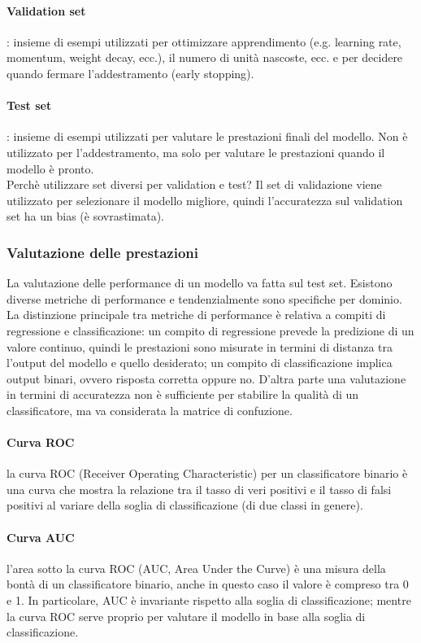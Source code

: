 \paragraph{Validation set}: insieme di esempi utilizzati per ottimizzare
apprendimento (e.g. learning rate, momentum, weight decay, ecc.), il numero di
unità nascoste, ecc. e per decidere quando fermare l'addestramento (early
stopping).

\paragraph{Test set}: insieme di esempi utilizzati per valutare le prestazioni
finali del modello. Non è utilizzato per l'addestramento, ma solo per valutare 
le prestazioni quando il modello è pronto.\\

Perchè utilizzare set diversi per validation e test? Il set di validazione viene
utilizzato per selezionare il modello migliore, quindi l'accuratezza sul
validation set ha un bias (è sovrastimata).

\subsubsection{Valutazione delle prestazioni}

La valutazione delle performance di un modello va fatta sul test set. Esistono
diverse metriche di performance e tendenzialmente sono specifiche per dominio.
La distinzione principale tra metriche di performance è relativa a compiti di
regressione e classificazione: un compito di regressione prevede la predizione
di un valore continuo, quindi le prestazioni sono misurate in termini di
distanza tra l'output del modello e quello desiderato; un compito di
classificazione implica output binari, ovvero risposta corretta oppure no.
D'altra parte una valutazione in termini di accuratezza non è sufficiente per
stabilire la qualità di un classificatore, ma va considerata la matrice di
confuzione.

\paragraph{Curva ROC} la curva ROC (Receiver Operating Characteristic) per un
classificatore binario è una curva che mostra la relazione tra il tasso di
veri positivi e il tasso di falsi positivi al variare della soglia di
classificazione (di due classi in genere).

\paragraph{Curva AUC} l'area sotto la curva ROC (AUC, Area Under the Curve) è
una misura della bontà di un classificatore binario, anche in questo caso il
valore è compreso tra 0 e 1. In particolare, AUC è invariante rispetto alla
soglia di classificazione; mentre la curva ROC serve proprio per valutare il
modello in base alla soglia di classificazione.
